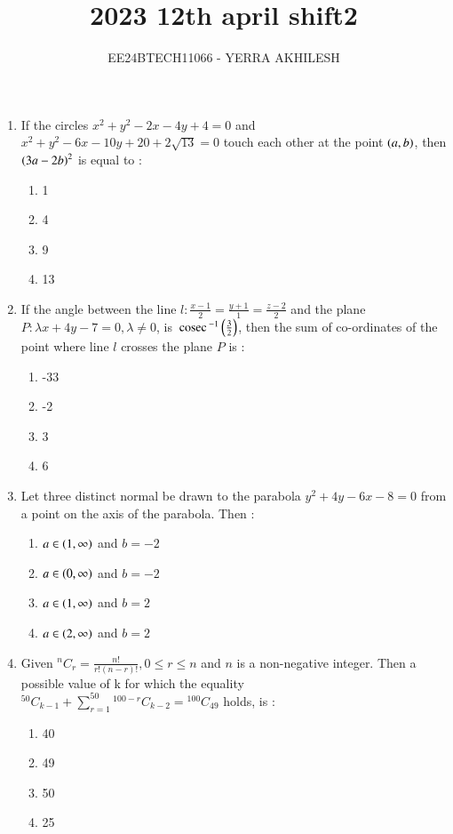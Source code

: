 \documentclass[journal]{IEEEtran}
\begin{document}

\vspace{3cm}

\title{2023 12th april shift2}
\author{EE24BTECH11066 - YERRA AKHILESH}
{\let\newpage\relax\maketitle}
\begin{enumerate}[start=16]
\item If the circles $x^2+y^2-2x-4y+4=0$ and $x^2+y^2-6x-10y+20+2\sqrt{13}=0$ touch each other at the point $\left(a,b\right)$, then $\left(3a-2b\right)^2$ is equal to :
\begin{enumerate}
    \item 1
    \item 4
    \item 9
    \item 13
\end{enumerate}

\item If the angle between the line $l:\frac{x-1}{2}=\frac{y+1}{1}=\frac{z-2}{2}$ and the plane $P:\lambda x+4y-7=0, \lambda\neq0$, is $\,\text{cosec}\,^{-1}\left(\frac{3}{2}\right)$, then the sum of co-ordinates of the point where line $l$ crosses the plane $P$  is :
\begin{enumerate}
    \item -33
    \item -2
    \item 3
    \item 6
\end{enumerate}

\item Let three distinct normal be drawn to the parabola $y^2+4y-6x-8=0$ from a point  on the axis of the parabola. Then :
\begin{enumerate}
    \item $a \in \left(1,\infty\right)$ and $b=-2$
    \item $a \in \left(0,\infty\right)$ and $b=-2$
    \item $a \in \left(1,\infty\right)$ and $b=2$
    \item $a \in \left(2,\infty\right)$ and $b=2$
\end{enumerate}

\item Given ${}^{n}C_{r} = \frac{n!}{r!(n-r)!}, 0\leq r \leq n$ and $n$ is a non-negative integer. Then a possible value of k for which the equality\\
${}^{50}C_{k-1}+\sum_{r=1}^{50}{}^{100-r}C_{k-2}={}^{100}C_{49}$ holds, is :
\begin{enumerate}
    \item 40
    \item 49
    \item 50
    \item 25
\end{enumerate}


\end{enumerate}
\end{document}
